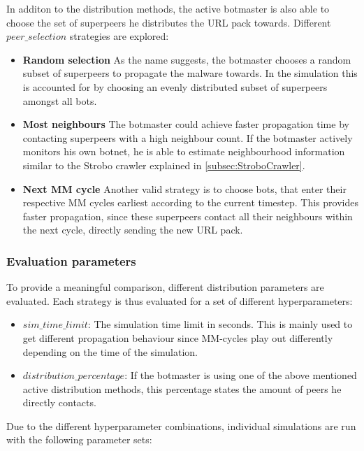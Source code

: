 \documentclass{article}
\begin{document}
In additon to the distribution methods, the active botmaster is also able to choose the set of superpeers he distributes the URL pack towards. Different $peer\_selection$ strategies are explored: 

\begin{itemize}
    \item \textbf{Random selection}  As the name suggests, the botmaster chooses a random subset of superpeers to propagate the malware towards. In the simulation this is accounted for by choosing an evenly distributed subset of superpeers amongst all bots. 
    \item \textbf{Most neighbours}  The botmaster could achieve faster propagation time by contacting superpeers with a high neighbour count. If the botmaster actively monitors his own botnet, he is able to estimate neighbourhood information similar to the Strobo crawler explained in \ref{subsec:StroboCrawler}.
    \item \textbf{Next MM cycle}  Another valid strategy is to choose bots, that enter their respective MM cycles earliest according to the current timestep. This provides faster propagation, since these superpeers contact all their neighbours within the next cycle, directly sending the new URL pack.
\end{itemize}

\subsubsection{Evaluation parameters}
To provide a meaningful comparison, different distribution parameters are evaluated. Each strategy is thus evaluated for a set of different hyperparameters:

\begin{itemize}
    \item $sim\_time\_limit$: The simulation time limit in seconds. This is mainly used to get different propagation behaviour since MM-cycles play out differently depending on the time of the simulation.
    \item $distribution\_percentage$: If the botmaster is using one of the above mentioned active distribution methods, this percentage states the amount of peers he directly contacts.
\end{itemize}

Due to the different hyperparameter combinations, individual simulations are run with the following parameter sets: \\
\end{document}

